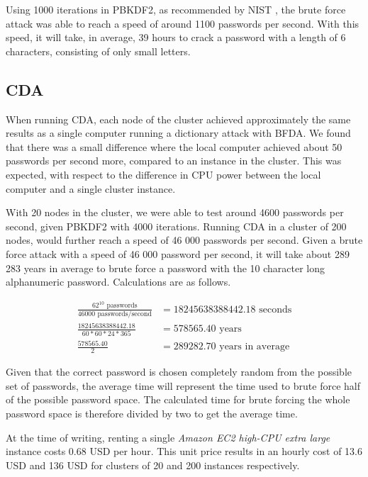 \documentclass[pdftex,english,10pt,b5paper,twoside]{book}
\begin{document}
Using 1000 iterations in \ac{PBKDF2}, as recommended by \ac{NIST} \cite{pbkdf_nist}, the
brute force attack was able to reach a speed of around 1100 passwords per
second. With this speed, it will take, in average, 39 hours to crack a password
with a length of 6 characters, consisting of only small letters.

\subsection{\acl{CDA}}

When running \ac{CDA}, each node of the cluster achieved approximately the same
results as a single computer running a dictionary attack with \ac{BFDA}. We
found that there was a small difference where the local computer achieved about
50 passwords per second more, compared to an instance in the cluster. This was
expected, with respect to the difference in \ac{CPU} power between the local
computer and a single cluster instance.

With 20 nodes in the cluster, we were able to test around 4600 passwords per
second, given \ac{PBKDF2} with 4000 iterations. Running \ac{CDA} in a cluster
of 200 nodes, would further reach a speed of 46 000 passwords per second. Given
a brute force attack with a speed of 46 000 password per second, it will take
about 289 283 years in average to brute force a password with the 10 character
long alphanumeric password. Calculations are as follows.

\begin{align*}
\frac{62^{10} \text{ passwords}}{46000 \text{ passwords/second}} &= 18245638388442.18 \text{ seconds} \\
\frac{18245638388442.18}{60 * 60 * 24 * 365} &= 578565.40 \text{ years} \\
\frac{578565.40}{2} &= 289282.70 \text{ years in average}
\end{align*}

Given that the correct password is chosen completely random from the possible
set of passwords, the average time will represent the time used to brute force
half of the possible password space. The calculated time for brute forcing the
whole password space is therefore divided by two to get the average time.

At the time of writing, renting a single \emph{Amazon EC2 high-CPU extra large}
instance costs 0.68 USD per hour. This unit price results in an hourly cost of
13.6 USD and 136 USD for clusters of 20 and 200 instances respectively.
\end{document}
